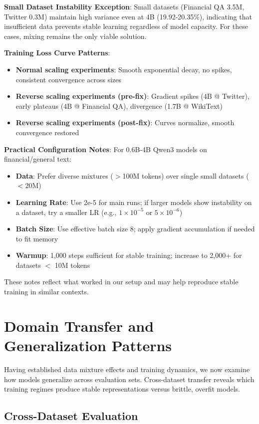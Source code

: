 \textbf{Small Dataset Instability Exception}: Small datasets (Financial QA 3.5M, Twitter 0.3M) maintain high variance even at 4B (19.92-20.35\%), indicating that insufficient data prevents stable learning regardless of model capacity. For these cases, mixing remains the only viable solution.

\textbf{Training Loss Curve Patterns}:
\begin{itemize}
\item \textbf{Normal scaling experiments}: Smooth exponential decay, no spikes, consistent convergence across sizes
\item \textbf{Reverse scaling experiments (pre-fix)}: Gradient spikes (4B @ Twitter), early plateaus (4B @ Financial QA), divergence (1.7B @ WikiText)
\item \textbf{Reverse scaling experiments (post-fix)}: Curves normalize, smooth convergence restored
\end{itemize}

\textbf{Practical Configuration Notes}: For 0.6B-4B Qwen3 models on financial/general text:
\begin{itemize}
\item \textbf{Data}: Prefer diverse mixtures ($>$100M tokens) over single small datasets ($<$20M)
\item \textbf{Learning Rate}: Use 2e-5 for main runs; if larger models show instability on a dataset, try a smaller LR (e.g., $1\times10^{-5}$ or $5\times10^{-6}$)
\item \textbf{Batch Size}: Use effective batch size 8; apply gradient accumulation if needed to fit memory
\item \textbf{Warmup}: 1,000 steps sufficient for stable training; increase to 2,000+ for datasets $<$ 10M tokens
\end{itemize}

These notes reflect what worked in our setup and may help reproduce stable training in similar contexts.

\section{Domain Transfer and Generalization Patterns}

Having established data mixture effects and training dynamics, we now examine how models generalize across evaluation sets. Cross-dataset transfer reveals which training regimes produce stable representations versus brittle, overfit models.

\subsection{Cross-Dataset Evaluation}

